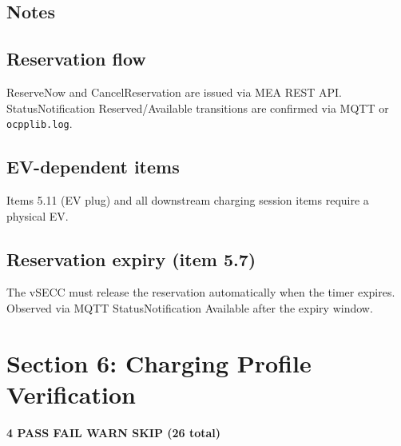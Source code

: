 \documentclass[10pt, a4paper]{article}
\begin{document}
\subsection*{Notes}

\subsection*{Reservation flow}
ReserveNow and CancelReservation are issued via MEA REST API.
StatusNotification Reserved/Available transitions are confirmed via MQTT or \texttt{ocpplib.log}.

\subsection*{EV-dependent items}
Items 5.11 (EV plug) and all downstream charging session items require a physical EV.

\subsection*{Reservation expiry (item 5.7)}
The vSECC must release the reservation automatically when the timer expires.
Observed via MQTT StatusNotification Available after the expiry window.



\newpage
\section{Section 6: Charging Profile Verification}
\textbf{4 PASS  FAIL  WARN  SKIP \quad (26 total)}
\end{document}
